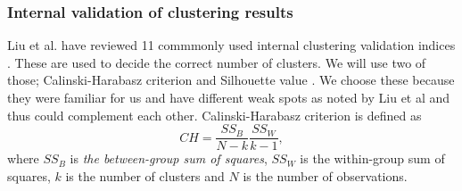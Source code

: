 % 






\subsubsection{Internal validation of clustering results}
Liu et al. have reviewed 11 commmonly used internal clustering 
validation indices \cite{liu_understanding_2010}. These are used 
to decide the correct number of clusters. We will use two 
of those; Calinski-Harabasz criterion \cite{calinski_dendrite_1974} 
and Silhouette value \cite{rousseeuw_silhouettes:_1987}. We choose 
these because they were familiar for us and have different
weak spots as noted by Liu et al and thus could complement each 
other. Calinski-Harabasz criterion is defined as
\begin{equation}
 CH = \frac{SS_B}{N-k} \frac{SS_W}{k-1},
\end{equation}
where $SS_B$ is \emph{the between-group sum of squares}, $SS_W$ is the
within-group sum of squares, $k$ is the number of clusters 
and $N$ is the number of observations.

